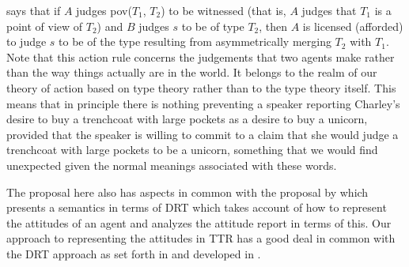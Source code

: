 \preveg{} says that if $A$ judges pov($T_1$, $T_2$) to be witnessed
(that is, $A$ judges that $T_1$ is a point of view of $T_2$) and $B$
judges $s$ to be of type $T_2$, then $A$ is licensed (afforded) to judge $s$ to be of the type
resulting from asymmetrically merging $T_2$ with $T_1$.  Note that
this action rule concerns the judgements that two agents make
rather than the way things actually are in the world.  It belongs to
the realm of our theory of action based on type theory rather than to
the type theory itself.  This means that in principle there is nothing
preventing a speaker reporting Charley's desire to buy a trenchcoat
with large pockets as a desire to buy a unicorn, provided that the
speaker is willing to commit to a claim that she would judge a
trenchcoat with large pockets to be a unicorn, something that we would
find unexpected given the normal meanings associated with these words.   

The proposal here also has aspects in common with the proposal by
\cite{Prossms} which presents a semantics in terms of DRT which takes
account of how to represent the attitudes of an agent and analyzes 
the attitude report in terms of this.  Our approach to representing
the attitudes in TTR has a good deal in common with the DRT approach
as set forth in \cite{Kamp1990,KampGenabithReyle2011} and developed in
\cite{Maier2016,Maier2017}.



